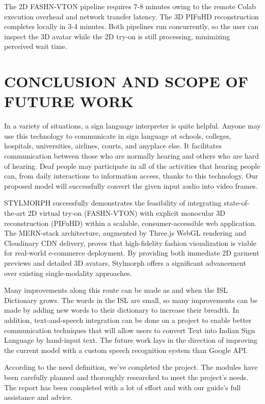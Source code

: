 \documentclass[12pt,a4paper,oneside]{report}
\begin{document}
The 2D FASHN-VTON pipeline requires 7-8 minutes owing to the remote Colab execution overhead and network transfer latency. The 3D PIFuHD reconstruction completes locally in 3-4 minutes. Both pipelines run concurrently, so the user can inspect the 3D avatar while the 2D try-on is still processing, minimizing perceived wait time.

\chapter{CONCLUSION AND SCOPE OF FUTURE WORK}

In a variety of situations, a sign language interpreter is quite helpful. Anyone may use this technology to communicate in sign language at schools, colleges, hospitals, universities, airlines, courts, and anyplace else. It facilitates communication between those who are normally hearing and others who are hard of hearing. Deaf people may participate in all of the activities that hearing people can, from daily interactions to information access, thanks to this technology. Our proposed model will successfully convert the given input audio into video frames.

STYLMORPH successfully demonstrates the feasibility of integrating state-of-the-art 2D virtual try-on (FASHN-VTON) with explicit monocular 3D reconstruction (PIFuHD) within a scalable, consumer-accessible web application. The MERN-stack architecture, augmented by Three.js WebGL rendering and Cloudinary CDN delivery, proves that high-fidelity fashion visualization is viable for real-world e-commerce deployment. By providing both immediate 2D garment previews and detailed 3D avatars, Stylmorph offers a significant advancement over existing single-modality approaches.

Many improvements along this route can be made as and when the ISL Dictionary grows. The words in the ISL are small, so many improvements can be made by adding new words to their dictionary to increase their breadth. In addition, text-and-speech integration can be done on a project to enable better communication techniques that will allow users to convert Text into Indian Sign Language by hand-input text. The future work lays in the direction of improving the current model with a custom speech recognition system than Google API.

According to the need definition, we've completed the project. The modules have been carefully planned and thoroughly researched to meet the project's needs. The report has been completed with a lot of effort and with our guide's full assistance and advice.
\end{document}
